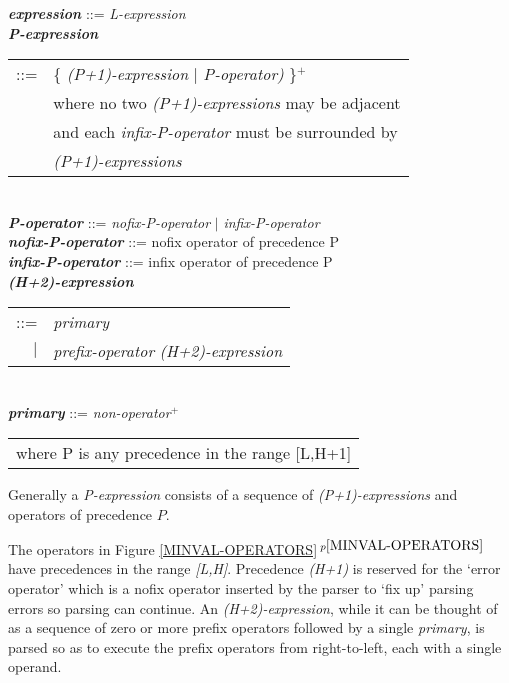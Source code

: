 \documentclass[12pt]{article}
\newcommand{\PLUS}[1][]{{$^{+#1}$}}
\newcommand{\emkey}[1]{{\em \bfseries #1}}
\newcommand{\itemref}[1]{\ref{#1}$\,^{p\pageref{#1}}$}
\newenvironment{indpar}[1][0.3in]%
	{\begin{list}{}%
		     {\setlength{\itemsep}{0in}%
		      \setlength{\topsep}{0in}%
		      \setlength{\parsep}{1ex}%
		      \setlength{\labelwidth}{#1}%
		      \setlength{\leftmargin}{#1}%
		      \addtolength{\leftmargin}{\labelsep}}%
	 \item}%
	{\end{list}}
\begin{document}
\begin{indpar}\begin{minipage}{6in}
\emkey{expression}\label{EXPRESSION} ::= {\em L-expression}
\\[0.5ex]
\emkey{P-expression}
    \begin{tabular}[t]{@{}rl}
    ::= & \{ {\em (P+1)-expression} $|$ {\em P-operator)} \}\PLUS{} \\
        & where no two {\em (P+1)-expressions} may be adjacent \\ 
        & and each {\em infix-P-operator} must be surrounded by \\
	& {\em (P+1)-expressions} \\
    \end{tabular}
\\[0.5ex]
\emkey{P-operator} ::= {\em nofix-P-operator} $|$ {\em infix-P-operator}
\\[0.5ex]
\emkey{nofix-P-operator} ::= nofix operator of precedence P
\\[0.5ex]
\emkey{infix-P-operator} ::= infix operator of precedence P
\\[0.5ex]
\emkey{(H+2)-expression}
    \begin{tabular}[t]{@{}rl}
    ::= & {\em primary} \\
    $|$ & {\em prefix-operator} {\em (H+2)-expression} \\
    \end{tabular}
\\[0.5ex]
\emkey{primary} ::= {\em non-operator}\PLUS{}
\\[2.0ex]
\hspace*{3em}\begin{tabular}{l}
where P is any precedence in the range [L,H+1]
\end{tabular}
\end{minipage}\end{indpar}

Generally
a {\em P-expression} consists of a sequence of {\em (P+1)-expressions}
and operators of precedence $P$.

The operators in Figure \itemref{MINVAL-OPERATORS} have precedences in
the range {\em [L,H]}.
Precedence {\em (H+1)} is reserved for the `error operator' which is a
nofix operator inserted by the parser to `fix up' parsing errors
so parsing can continue.
An {\em (H+2)-expression}, while it can be thought of as a sequence
of zero or more prefix operators followed by a single {\em primary},
is parsed so as to execute the prefix operators from right-to-left, each
with a single operand.
\end{document}

